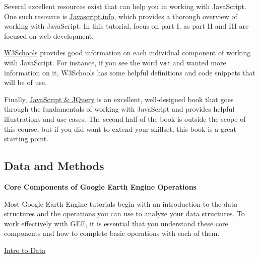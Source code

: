 \documentclass[
]{article}
\begin{document}
Several excellent resources exist that can help you in working with JavaScript. One such resource is \href{https://javascript.info}{Javascript.info}, which provides a thorough overview of working with JavaScript. In this tutorial, focus on part I, as part II and III are focused on web development.

\href{https://www.w3schools.com/js/default.asp}{W3Schools} provides good information on each individual component of working with JavaScript. For instance, if you see the word \texttt{var} and wanted more information on it, W3Schools has some helpful definitions and code snippets that will be of use.

Finally, \href{http://www.javascriptbook.com}{JavaScript \& JQuery} is an excellent, well-designed book that goes through the fundamentals of working with JavaScript and provides helpful illustrations and use cases. The second half of the book is outside the scope of this course, but if you did want to extend your skillset, this book is a great starting point.

\hypertarget{data-and-methods}{%
\subsection{Data and Methods}\label{data-and-methods}}

\textbf{Core Components of Google Earth Engine Operations}

Most Google Earth Engine tutorials begin with an introduction to the data structures and the operations you can use to analyze your data structures. To work effectively with GEE, it is essential that you understand these core components and how to complete basic operations with each of them.

\href{https://developers.google.com/earth-engine/guides}{Intro to Data}
\end{document}
